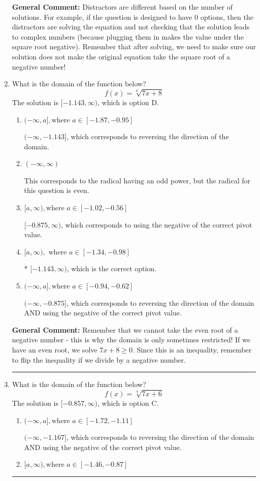 \documentclass{extbook}[14pt]
\newcommand{\litem}[1]{\item #1

\rule{\textwidth}{0.4pt}}
\begin{document}
\begin{enumerate}
{\textbf{General Comment:} Distractors are different based on the number of solutions. For example, if the question is designed to have 0 options, then the distractors are solving the equation and not checking that the solution leads to complex numbers (because plugging them in makes the value under the square root negative). Remember that after solving, we need to make sure our solution does not make the original equation take the square root of a negative number!
}
\litem{
What is the domain of the function below?
\[ f(x) = \sqrt[6]{7 x + 8} \]
The solution is \( [-1.143, \infty) \), which is option D.\begin{enumerate}[label=\Alph*.]
\item \( (-\infty, a], \text{where } a \in [-1.87, -0.95] \)

 $(-\infty, -1.143]$, which corresponds to reversing the direction of the domain.
\item \( (-\infty, \infty) \)

This corresponds to the radical having an odd power, but the radical for this question is even.
\item \( [a, \infty), \text{where } a \in [-1.02, -0.56] \)

$[-0.875, \infty)$, which corresponds to using the negative of the correct pivot value.
\item \( [a, \infty), \text{ where } a \in [-1.34, -0.98] \)

* $[-1.143, \infty)$, which is the correct option.
\item \( (-\infty, a], \text{where } a \in [-0.94, -0.62] \)

$(-\infty, -0.875]$, which corresponds to reversing the direction of the domain AND using the negative of the correct pivot value.
\end{enumerate}

\textbf{General Comment:} Remember that we cannot take the even root of a negative number - this is why the domain is only sometimes restricted! If we have an even root, we solve $7 x + 8 \geq 0$. Since this is an inequality, remember to flip the inequality if we divide by a negative number.
}
\litem{
What is the domain of the function below?
\[ f(x) = \sqrt[4]{7 x + 6} \]
The solution is \( [-0.857, \infty) \), which is option C.\begin{enumerate}[label=\Alph*.]
\item \( (-\infty, a], \text{where } a \in [-1.72, -1.11] \)

$(-\infty, -1.167]$, which corresponds to reversing the direction of the domain AND using the negative of the correct pivot value.
\item \( [a, \infty), \text{where } a \in [-1.46, -0.87] \)


\end{enumerate}}
\end{enumerate}
\end{document}

